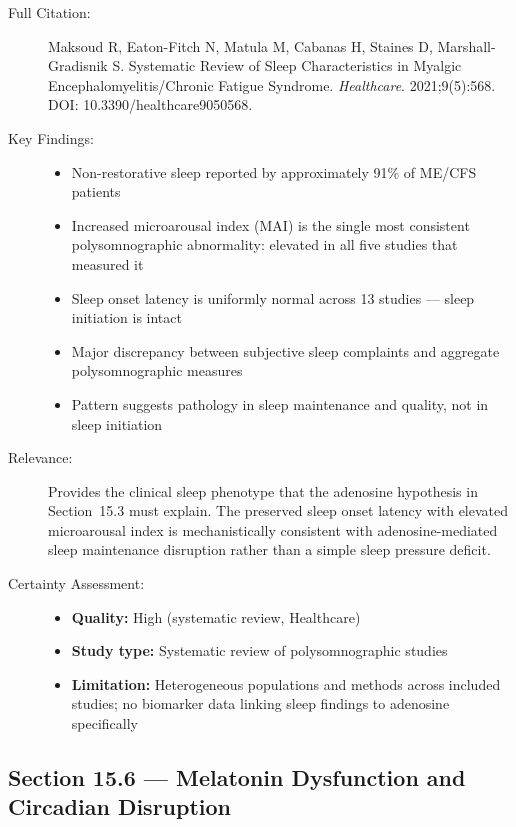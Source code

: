 \begin{description}
    \item[Full Citation:] Maksoud R, Eaton-Fitch N, Matula M, Cabanas H, Staines D, Marshall-Gradisnik S\@. Systematic Review of Sleep Characteristics in Myalgic Encephalomyelitis/Chronic Fatigue Syndrome. \textit{Healthcare}. 2021;9(5):568. DOI: 10.3390/healthcare9050568.
    \item[Key Findings:]
    \begin{itemize}
        \item Non-restorative sleep reported by approximately 91\% of ME/CFS patients
        \item Increased microarousal index (MAI) is the single most consistent polysomnographic abnormality: elevated in all five studies that measured it
        \item Sleep onset latency is uniformly normal across 13 studies --- sleep initiation is intact
        \item Major discrepancy between subjective sleep complaints and aggregate polysomnographic measures
        \item Pattern suggests pathology in sleep maintenance and quality, not in sleep initiation
    \end{itemize}
    \item[Relevance:] Provides the clinical sleep phenotype that the adenosine hypothesis in Section~15.3 must explain. The preserved sleep onset latency with elevated microarousal index is mechanistically consistent with adenosine-mediated sleep maintenance disruption rather than a simple sleep pressure deficit.
    \item[Certainty Assessment:]
    \begin{itemize}
        \item \textbf{Quality:} High (systematic review, Healthcare)
        \item \textbf{Study type:} Systematic review of polysomnographic studies
        \item \textbf{Limitation:} Heterogeneous populations and methods across included studies; no biomarker data linking sleep findings to adenosine specifically
    \end{itemize}
\end{description}

\subsection*{Section 15.6 --- Melatonin Dysfunction and Circadian Disruption}

